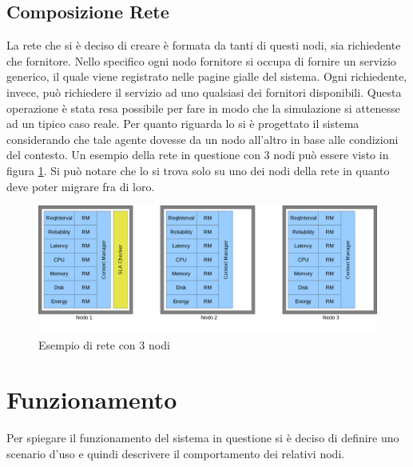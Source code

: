 \subsection{Composizione Rete}
La rete che si è deciso di creare è formata da tanti di questi nodi, sia richiedente che fornitore. Nello specifico ogni nodo fornitore si occupa di fornire un servizio generico, il quale viene registrato nelle pagine gialle del sistema. Ogni richiedente, invece, può richiedere il servizio ad uno qualsiasi dei fornitori disponibili. Questa operazione è stata resa possibile per fare in modo che la simulazione si attenesse ad un tipico caso reale. Per quanto riguarda lo  si è progettato il sistema considerando che tale agente dovesse  da un nodo all'altro in base alle condizioni del contesto. Un esempio della rete in questione con 3 nodi può essere visto in figura \ref{rete}. Si può notare che lo  si trova solo su uno dei nodi della rete in quanto deve poter migrare fra di loro.
\begin{figure}[H]
\begin{center}
\includegraphics[scale=0.23]{etc/rete.png}
\caption{Esempio di rete con 3 nodi}
\label{rete}
\end{center}
\end{figure}
\section{Funzionamento}
Per spiegare il funzionamento del sistema in questione si è deciso di definire uno scenario d'uso e quindi descrivere il comportamento dei relativi nodi.
